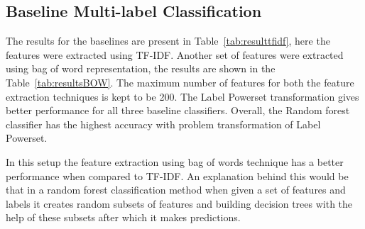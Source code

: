 \subsection{Baseline Multi-label Classification}
The results for the baselines are present in Table~\ref{tab:resulttfidf}, here the features were extracted using TF-IDF. Another set of features were extracted using bag of word representation, the results are shown in the Table~\ref{tab:resultsBOW}. The maximum number of features for both the feature extraction techniques is kept to be 200. 
The Label Powerset transformation gives better performance for all three baseline classifiers. Overall, the Random forest classifier has the highest accuracy with problem transformation of Label Powerset. 

In this setup the feature extraction using bag of words technique has a better performance when compared to TF-IDF. An explanation behind this would be that in a random forest classification method when given a set of features and labels it creates random subsets of features and building decision trees with the help of these subsets after which it makes predictions. 


\begin{table}[!htb]
\centering
    \caption{Results of predicting super class using TF-IDF feature selection}
    \label{tab:resulttfidf}
\end{table}

